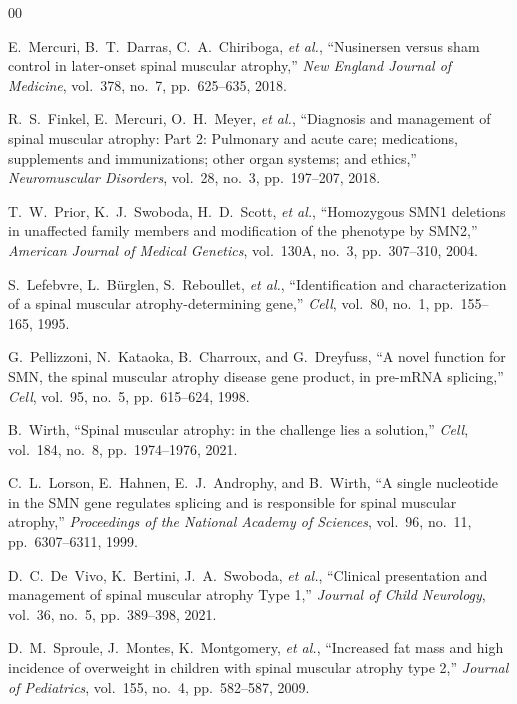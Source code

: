 \documentclass[journal]{IEEEtran}
\begin{document}
\begin{thebibliography}{00}

E.~Mercuri, B.~T.~Darras, C.~A.~Chiriboga, \textit{et al.}, ``Nusinersen versus sham control in later-onset spinal muscular atrophy,'' \textit{New England Journal of Medicine}, vol.~378, no.~7, pp.~625--635, 2018.

R.~S.~Finkel, E.~Mercuri, O.~H.~Meyer, \textit{et al.}, ``Diagnosis and management of spinal muscular atrophy: Part 2: Pulmonary and acute care; medications, supplements and immunizations; other organ systems; and ethics,'' \textit{Neuromuscular Disorders}, vol.~28, no.~3, pp.~197--207, 2018.

T.~W.~Prior, K.~J.~Swoboda, H.~D.~Scott, \textit{et al.}, ``Homozygous SMN1 deletions in unaffected family members and modification of the phenotype by SMN2,'' \textit{American Journal of Medical Genetics}, vol.~130A, no.~3, pp.~307--310, 2004.

S.~Lefebvre, L.~B\"urglen, S.~Reboullet, \textit{et al.}, ``Identification and characterization of a spinal muscular atrophy-determining gene,'' \textit{Cell}, vol.~80, no.~1, pp.~155--165, 1995.

G.~Pellizzoni, N.~Kataoka, B.~Charroux, and G.~Dreyfuss, ``A novel function for SMN, the spinal muscular atrophy disease gene product, in pre-mRNA splicing,'' \textit{Cell}, vol.~95, no.~5, pp.~615--624, 1998.

B.~Wirth, ``Spinal muscular atrophy: in the challenge lies a solution,'' \textit{Cell}, vol.~184, no.~8, pp.~1974--1976, 2021.

C.~L.~Lorson, E.~Hahnen, E.~J.~Androphy, and B.~Wirth, ``A single nucleotide in the SMN gene regulates splicing and is responsible for spinal muscular atrophy,'' \textit{Proceedings of the National Academy of Sciences}, vol.~96, no.~11, pp.~6307--6311, 1999.

D.~C.~De~Vivo, K.~Bertini, J.~A.~Swoboda, \textit{et al.}, ``Clinical presentation and management of spinal muscular atrophy Type 1,'' \textit{Journal of Child Neurology}, vol.~36, no.~5, pp.~389--398, 2021.

D.~M.~Sproule, J.~Montes, K.~Montgomery, \textit{et al.}, ``Increased fat mass and high incidence of overweight in children with spinal muscular atrophy type 2,'' \textit{Journal of Pediatrics}, vol.~155, no.~4, pp.~582--587, 2009.


\end{thebibliography}
\end{document}
